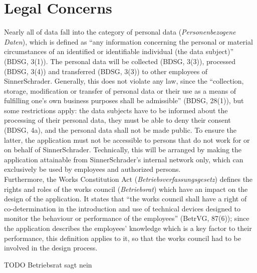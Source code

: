 \newpage

\section{Legal Concerns}
Nearly all of data fall into the category of personal data (\textit{Personenbezogene Daten}), which is defined as ``any information concerning the personal or material circumstances of an identified or identifiable individual (the data subject)'' (BDSG, 3(1)). The personal data will be collected (BDSG, 3(3)), processed (BDSG, 3(4)) and transferred (BDSG, 3(3)) to other employees of SinnerSchrader.
Generally, this does not violate any law, since the ``collection, storage, modification or transfer of personal data or their use as a means of fulfilling one’s own business purposes shall be admissible'' (BDSG, 28(1)), but some restrictions apply: the data subjects have to be informed about the processing of their personal data, they must be able to deny their consent (BDSG, 4a), and the personal data shall not be made public.
To ensure the latter, the application must not be accessible to persons that do not work for or on behalf of SinnerSchrader. Technically, this will be arranged by making the application attainable from SinnerSchrader's internal network only, which can exclusively be used by employees and authorized persons.\\
Furthermore, the Works Constitution Act (\textit{Betriebsverfassungsgesetz}) defines the rights and roles of the works council (\textit{Betriebsrat}) which have an impact on the design of the application. It states that ``the works council shall have a right of co-determination in the introduction and use of technical devices designed to monitor the behaviour or performance of the employees'' (BetrVG, 87(6)); since the application describes the employees' knowledge which is a key factor to their performance, this definition applies to it, so that the works council had to be involved in the design process.

TODO Betriebsrat sagt nein
